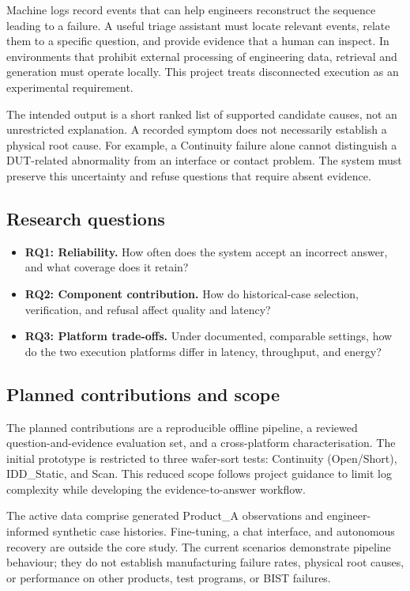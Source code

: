 \documentclass[conference]{IEEEtran}
\begin{document}
Machine logs record events that can help engineers reconstruct the
sequence leading to a failure. A useful triage assistant must locate
relevant events, relate them to a specific question, and provide
evidence that a human can inspect. In environments that prohibit
external processing of engineering data, retrieval and generation
must operate locally. This project treats disconnected execution
as an experimental requirement.

The intended output is a short ranked list of supported candidate
causes, not an unrestricted explanation. A recorded symptom does
not necessarily establish a physical root cause. For example,
a Continuity failure alone cannot distinguish a DUT-related
abnormality from an interface or contact problem. The system must
preserve this uncertainty and refuse questions that require
absent evidence.

\subsection{Research questions}

\begin{itemize}
\item \textbf{RQ1: Reliability.}
How often does the system accept an incorrect answer,
and what coverage does it retain?

\item \textbf{RQ2: Component contribution.}
How do historical-case selection, verification, and refusal
affect quality and latency?

\item \textbf{RQ3: Platform trade-offs.}
Under documented, comparable settings, how do the two execution
platforms differ in latency, throughput, and energy?
\end{itemize}

\subsection{Planned contributions and scope}

The planned contributions are a reproducible offline pipeline,
a reviewed question-and-evidence evaluation set, and a cross-platform
characterisation. The initial prototype is restricted to three
wafer-sort tests: Continuity (Open/Short), IDD\_Static, and Scan.
This reduced scope follows project guidance to limit log complexity
while developing the evidence-to-answer workflow.

The active data comprise generated Product\_A observations and
engineer-informed synthetic case histories. Fine-tuning, a chat
interface, and autonomous recovery are outside the core study.
The current scenarios demonstrate pipeline behaviour; they do not
establish manufacturing failure rates, physical root causes,
or performance on other products, test programs, or BIST failures.
\end{document}
